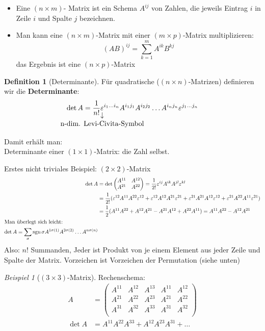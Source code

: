 \documentclass[a4paper]{scrartcl}
\DeclareMathOperator{\sgn}{sgn}
\theoremstyle{definition}
\newtheorem{defn}{Definition}
\theoremstyle{plain}
\theoremstyle{remark}
\theoremstyle{remark}
\newtheorem{ex}{Beispiel}
\newcommand{\eps}{\ensuremath{\varepsilon}}%
\begin{document}
\begin{itemize}
\item Eine $(n\times m)$- Matrix ist ein Schema $A^{ij}$ von Zahlen, die jeweils Eintrag $i$ in Zeile $i$ und Spalte $j$ bezeichnen.
\item Man kann eine $(n\times m)$-Matrix mit einer $(m\times p)$-Matrix multiplizieren:
\[(AB)^{ij} = \sum_{k = 1}^{m}A^{ik} B^{kj}\]
das Ergebnis ist eine $(n\times p)$-Matrix
\end{itemize}

\begin{defn}[Determinante]
Für quadratische ($(n\times n)$-Matrizen) definieren wir die \textbf{Determinante}:
\[\det A = \frac{1}{n!} \underarrow[\eps]{n-dim. Levi-Civita-Symbol}^{i_1 \ldots i_n} A^{i_1 j_1} A^{i_2 j_2} \ldots A^{i_n j_n} \eps^{j_1 \ldots j_n} \]

Damit erhält man: \\
   Determinante einer $(1\times 1)$-Matrix: die Zahl selbst.

Erstes nicht triviales Beispiel: $(2\times 2)$-Matrix
\begin{align*}
\det A &= \det \begin{pmatrix} A^{11} & A^{12} \\ A^{21} & A^{22}\end{pmatrix} = \frac{1}{2!} \eps^{ij} A^{ik} A^{jl} \eps^{kl} \\
&= \frac{1}{2!}(\eps^{12}A^{11}A^{22}\eps^{12} + \eps^{12}A^{12}A^{21}\eps^{21} + \eps^{21}A^{21}A^{12}\eps^{12} + \eps^{21}A^{22}A^{11}\eps^{21}) \\
&= \frac{1}{2} (A^{11} A^{22} + A^{12} A^{21} - A^{21}A^{12} + A^{22}A^{11}) = A^{11}A^{22} - A^{12}A^{21} \\
\intertext{Man überlegt sich leicht:}
\det A = \sum_{\sigma} \sgn{\sigma}A^{1\sigma(1)} A^{2\sigma(2)} \ldots A^{n\sigma(n)} \\
\end{align*}
Also: $n!$ Summanden, Jeder ist Produkt von je einem Element aus jeder Zeile und Spalte der Matrix. Vorzeichen ist Vorzeichen der Permutation (siehe unten)
\end{defn}
\begin{ex}[$(3\times 3)$-Matrix]
Rechenschema:
\begin{align*}
A&=\begin{pmatrix} A^{11} & A^{12} & A^{13} & A^{11} & A^{12} \\ A^{21} & A^{22} & A^{23} & A^{21} & A^{22} \\ A^{31} & A^{32} & A^{33} & A^{31} & A^{32} \\ \end{pmatrix} \\
\det A &= A^{11}A^{22}A^{33} + A^{12}A^{23}A^{31} + \ldots
\end{align*}
\end{ex}
\end{document}
